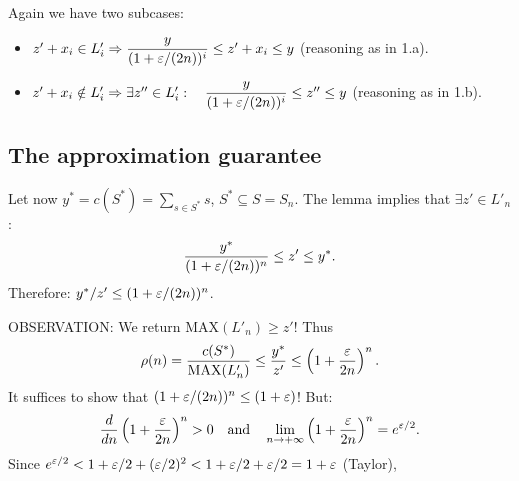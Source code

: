 Again we have two subcases:
\begin{itemize}
\item[2.a] $z'+x_i\in L'_i\Rightarrow\dfrac y{(1+\varepsilon/(2n))^i}\leq z'+x_i\leq y$ (reasoning as in 1.a).
\item[2.b] $z'+x_i\notin L'_i\Rightarrow\exists z''\in L'_i:\quad\dfrac y{(1+\varepsilon/(2n))^i}\leq z''\leq y$ (reasoning as in 1.b).
\end{itemize}
\subsection{The approximation guarantee}
Let now $y^*=c(S^*)=\sum_{s\in S^*}s$, $S^*\subseteq S=S_n$.
The lemma implies that $\exists z'\in L'_n$:
\[\frac{y^*}{(1+\varepsilon/(2n))^n}\leq z'\leq y^*.\]
Therefore: $y^*/z'\leq(1+\varepsilon/(2n))^n$.

OBSERVATION: We return MAX$(L'_n)\geq z'$!
Thus
\[\rho(n)=\frac{c(S^*)}{\mathrm{MAX}(L'_n)}\leq\frac{y^*}{z'}
\leq\left(1+\frac{\varepsilon}{2n}\right)^n.\]
It suffices to show that $(1+\varepsilon/(2n))^n\leq(1+\varepsilon)$!
But:
\[\frac d{dn}\left(1+\frac{\varepsilon}{2n}\right)^n>0
\quad\text{and}\quad
\lim_{n\to+\infty}\left(1+\frac{\varepsilon}{2n}\right)^n=e^{\varepsilon/2}.\]
Since $e^{\varepsilon/2}<1+\varepsilon/2+(\varepsilon/2)^2<1+\varepsilon/2+\varepsilon/2=1+\varepsilon$ (Taylor),
